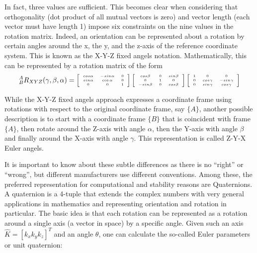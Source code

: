 In fact, three values are sufficient. This becomes clear when considering that orthogonality (dot product of all mutual vectors is zero) and vector length (each vector must have length 1) impose six constraints on the nine values in the rotation matrix. Indeed, an orientation can be represented about a rotation by certain angles around the x, the y, and the z-axis of the reference coordinate system. This is known as the X-Y-Z fixed angels notation. Mathematically, this can be represented by a rotation matrix of the form
\begin{equation}
\tiny
^A_BR_{XYZ}(\gamma,\beta,\alpha)=\left[\begin{array}{ccc}cos\alpha & -sin\alpha & 0\\sin\alpha & \cos\alpha & 0\\0 & 0 & 1\end{array}\right]\left[\begin{array}{ccc}cos\beta& 0 & sin\beta\\0 & 1 & 0\\-sin\beta & 0 & cos\beta\end{array}\right]\left[\begin{array}{ccc}1 & 0 & 0 \\ 0 & cos\gamma & -sin\gamma\\0 & sin\gamma & cos\gamma\end{array}\right]
\end{equation}

While the X-Y-Z fixed angels approach expresses a coordinate frame using rotations with respect to the original coordinate frame, say $\{A\}$, another possible description is to start with a coordinate frame $\{B\}$ that is coincident with frame $\{A\}$, then rotate around the Z-axis with angle $ \alpha$, then the Y-axis with angle $ \beta$ and finally around the X-axis with angle $ \gamma$. This representation is called Z-Y-X Euler angels.

It is important to know about these subtle differences as there is no ``right'' or ``wrong'', but different manufacturers use different conventions. Among these, the preferred representation for computational and stability reasons are Quaternions. A quaternion is a 4-tuple that extends the complex numbers with very general applications in mathematics and representing orientation and rotation in particular. The basic idea is that each rotation can be represented as a rotation around a single axis (a vector in space) by a specific angle. Given such an axis $ \hat{K}=[k_x k_y k_z]^T$ and an angle $ \theta$, one can calculate the so-called Euler parameters or unit quaternion:

